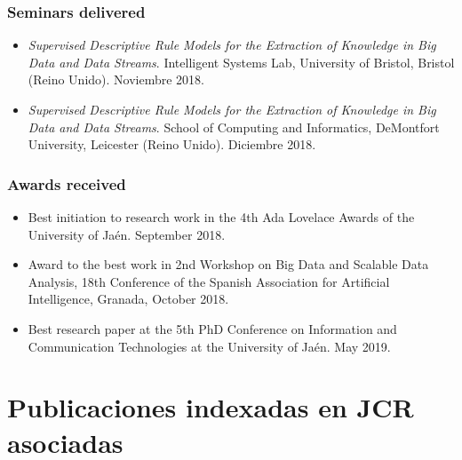 \documentclass[c5paper,10pt,twoside]{book}	   	%
\begin{document}
\begin{otherlanguage}{british}
\subsection{Seminars delivered}
		
		\begin{itemize}
			\item \textit{Supervised Descriptive Rule Models for the Extraction of Knowledge in Big Data and Data Streams}. Intelligent Systems Lab, University of Bristol, Bristol (Reino Unido). Noviembre 2018.
			
			\item \textit{Supervised Descriptive Rule Models for the Extraction of Knowledge in Big Data and Data Streams}. School of Computing and Informatics, DeMontfort University, Leicester (Reino Unido). Diciembre 2018.
		\end{itemize}
		
\subsection{Awards received}
		
		\begin{itemize}
			
			\item Best initiation to research work in the 4th Ada Lovelace Awards of the University of Jaén. September 2018.
			
			\item Award to the best work in 2nd Workshop on Big Data and Scalable Data Analysis, 18th Conference of the Spanish Association for Artificial Intelligence, Granada, October 2018.
			
			\item Best research paper at the 5th PhD Conference on Information and Communication Technologies at the University of Jaén. May 2019.
		\end{itemize}\clearpage{} \cleardoublepage
\end{otherlanguage}

\renewcommand{\figurename}{Figura}
\renewcommand{\tablename}{Tabla}

   \lhead[ ]{\footnotesize{\sc{\thesection: \rm\rightmark}}}  

\clearpage{}








\chapter{Publicaciones indexadas en JCR asociadas}\label{chap:publications}
\end{document}
